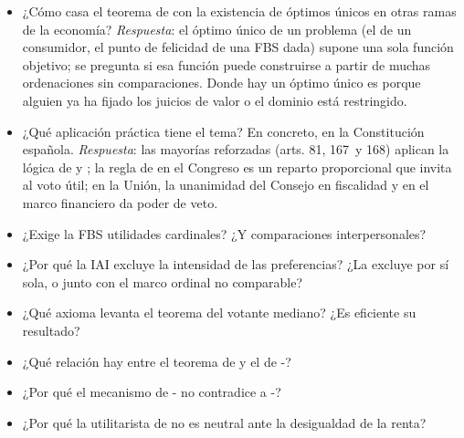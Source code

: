 \documentclass[11pt]{article}
\begin{document}
\begin{itemize}
\item ¿Cómo casa el teorema de  con la existencia de óptimos únicos en otras ramas de la economía? \emph{Respuesta}: el óptimo único de un problema (el de un consumidor, el punto de felicidad de una FBS dada) supone una sola función objetivo;  se pregunta si esa función puede construirse a partir de muchas ordenaciones sin comparaciones. Donde hay un óptimo único es porque alguien ya ha fijado los juicios de valor o el dominio está restringido.
\item ¿Qué aplicación práctica tiene el tema? En concreto, en la Constitución española. \emph{Respuesta}: las mayorías reforzadas (arts. 81, 167~y 168) aplican la lógica de  y ; la regla de  en el Congreso es un reparto proporcional que invita al voto útil; en la Unión, la unanimidad del Consejo en fiscalidad y en el marco financiero da poder de veto.
\item ¿Exige la FBS utilidades cardinales? ¿Y comparaciones interpersonales?
\item ¿Por qué la IAI excluye la intensidad de las preferencias? ¿La excluye por sí sola, o junto con el marco ordinal no comparable?
\item ¿Qué axioma levanta el teorema del votante mediano? ¿Es eficiente su resultado?
\item ¿Qué relación hay entre el teorema de  y el de -?
\item ¿Por qué el mecanismo de - no contradice a -?
\item ¿Por qué la utilitarista de  no es neutral ante la desigualdad de la renta?
\end{itemize}

\bibliografia
\end{document}
